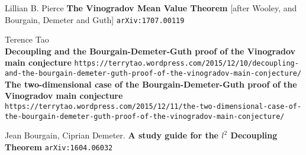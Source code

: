 \documentclass[12pt]{article}
\begin{document}
\vfill



\begin{thebibliography}{}

\item Lillian B. Pierce 
\textbf{
The Vinogradov Mean Value Theorem }[after Wooley, and Bourgain, Demeter and Guth] \texttt{arXiv:1707.00119}

\item Terence Tao \\
\textbf{Decoupling and the Bourgain-Demeter-Guth proof of the Vinogradov main conjecture}
\texttt{https://terrytao.wordpress.com/2015/12/10/decoupling-and-the-bourgain-demeter-guth-proof-of-the-vinogradov-main-conjecture/} \\ 
\textbf{The two-dimensional case of the Bourgain-Demeter-Guth proof of the Vinogradov main conjecture}
\texttt{https://terrytao.wordpress.com/2015/12/11/the-two-dimensional-case-of-the-bourgain-demeter-guth-proof-of-the-vinogradov-main-conjecture/}

\item Jean Bourgain, Ciprian Demeter. \textbf{A study guide for the $l^2$ Decoupling Theorem}  \texttt{arXiv:1604.06032}

\end{thebibliography}
\end{document}
